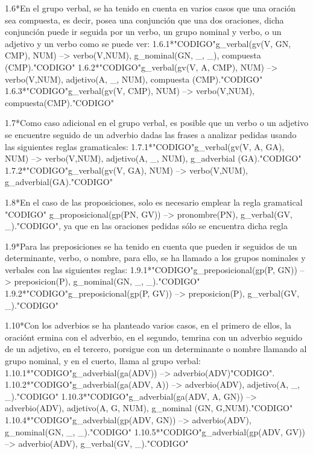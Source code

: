 ﻿\documentclass[a4paper]{article}
\begin{document}
 1.6*En el grupo verbal, se ha tenido en cuenta en varios casos que una oración sea compuesta, es         decir, posea una conjunción que una dos oraciones, dicha conjunción puede ir seguida por un           verbo, un grupo nominal y verbo, o un adjetivo y un verbo como se puede ver:
            1.6.1*"CODIGO"g_verbal(gv(V, GN, CMP), NUM) --> verbo(V,NUM), g_nominal(GN, _, _), compuesta               (CMP)."CODIGO"
            1.6.2*"CODIGO"g_verbal(gv(V, A, CMP), NUM) --> verbo(V,NUM), adjetivo(A, _, NUM), compuesta                (CMP)."CODIGO"
            1.6.3*"CODIGO"g_verbal(gv(V, CMP), NUM) --> verbo(V,NUM), compuesta(CMP)."CODIGO"
     
 1.7*Como caso adicional en el grupo verbal, es posible que un verbo o un adjetivo se encuentre           seguido de un adverbio dadas las frases a analizar pedidas usando las siguientes reglas               gramaticales:
            1.7.1*"CODIGO"g_verbal(gv(V, A, GA), NUM) --> verbo(V,NUM), adjetivo(A, _, NUM), g_adverbial               (GA)."CODIGO"
            1.7.2*"CODIGO"g_verbal(gv(V, GA), NUM) --> verbo(V,NUM), g_adverbial(GA)."CODIGO"
    
 1.8*En el caso de las proposiciones, solo es necesario emplear la regla gramatical "CODIGO"      g_proposicional(gp(PN, GV)) --> pronombre(PN), g_verbal(GV, _)."CODIGO", ya que en las oraciones      pedidas sólo se encuentra dicha regla 
     
 1.9*Para las preposiciones se ha tenido en cuenta que pueden ir seguidos de un determinante, verbo, o nombre, para ello, se ha llamado a los grupos nominales y verbales con las siguientes reglas:
            1.9.1*"CODIGO"g_preposicional(gp(P, GN)) --> preposicion(P), g_nominal(GN, _, _)."CODIGO"
            1.9.2*"CODIGO"g_preposicional(gp(P, GV)) --> preposicion(P), g_verbal(GV, _)."CODIGO"
     
 1.10*Con los adverbios se ha planteado varios casos, en el primero de ellos, la oraciónt ermina con      el adverbio, en el segundo, temrina con un adverbio seguido de un adjetivo, en el tercero,           porsigue con un determinante o nombre llamando al grupo nominal, y en el cuerto, llama al grupo       verbal:
            1.10.1*"CODIGO"g_adverbial(ga(ADV)) --> adverbio(ADV)"CODIGO".
            1.10.2*"CODIGO"g_adverbial(ga(ADV, A)) --> adverbio(ADV), adjetivo(A, _, _)."CODIGO"
            1.10.3*"CODIGO"g_adverbial(ga(ADV, A, GN)) --> adverbio(ADV), adjetivo(A, G, NUM), g_nominal            (GN, G,NUM)."CODIGO"
            1.10.4*"CODIGO"g_adverbial(gp(ADV, GN)) --> adverbio(ADV), g_nominal(GN, _, _)."CODIGO"
            1.10.5*"CODIGO"g_adverbial(gp(ADV, GV)) --> adverbio(ADV), g_verbal(GV, _)."CODIGO"
     
\end{document}
